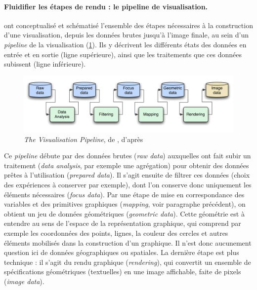 \paragraph{Fluidifier les étapes de rendu : le \og pipeline de visualisation\fg{}.}\label{par:visualisation-pipeline}

\textcite{dos_santos_gaining_2004} ont conceptualisé et schématisé l'ensemble des étapes nécessaires à la construction d'une visualisation, depuis les données brutes jusqu'à l'image finale, au sein d'un \og \textit{pipeline}\fg{} de la visualisation (\cref{fig:visualisation-pipeline}).
Ils y décrivent les différents états des données en entrée et en sortie (ligne supérieure), ainsi que les traitements que ces données subissent (ligne inférieure).

\begin{figure}[H]
	\centering
	\includegraphics[width=\linewidth]{img/Visualisation_Pipeline_p92.png}
	\caption[\og \textit{The Visualisation Pipeline}\fg{}.]{\og \textit{The Visualisation Pipeline}\fg{}, de \textcite[92]{keim_mastering_2010}, d'après \textcite[314]{dos_santos_gaining_2004}}
	\label{fig:visualisation-pipeline}
\end{figure}

Ce \textit{pipeline} débute par des données brutes (\textit{raw data}) auxquelles ont fait subir un traitement (\textit{data analysis}, par exemple une agrégation) pour obtenir des données prêtes à l'utilisation (\textit{prepared data}).
Il s'agit ensuite de filtrer ces données (choix des expériences à conserver par exemple), dont l'on conserve donc uniquement les éléments nécessaires (\textit{focus data}).
Par une étape de mise en correspondance des variables et des primitives graphiques (\textit{mapping}, voir paragraphe précédent), on obtient un jeu de données \og géométriques \fg{} (\textit{geometric data}).
Cette \og géométrie\fg{} est à entendre au sens de l'espace de la représentation graphique, qui comprend par exemple les coordonnées des points, lignes, la couleur des cercles et autres éléments mobilisés dans la construction d'un graphique.
Il n'est donc aucunement question ici de données géographiques ou spatiales.
La dernière étape est plus technique : il s'agit du \og rendu graphique\fg{} (\textit{rendering}), qui convertit un ensemble de spécifications géométriques (textuelles) en une image affichable, faite de pixels (\textit{image data}).

